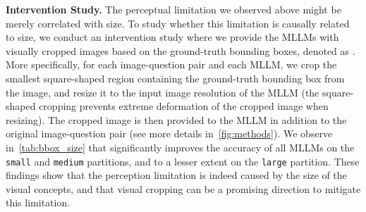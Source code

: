 \textbf{Intervention Study.} The perceptual limitation we observed above might be merely correlated with size. To study whether this limitation is causally related to size, we conduct an intervention study where we provide the MLLMs with visually cropped images based on the ground-truth bounding boxes, denoted as \hc{}. More specifically, for each image-question pair and each MLLM, we crop the smallest square-shaped region containing the ground-truth bounding box from the image, and resize it to the input image resolution of the MLLM (the square-shaped cropping prevents extreme deformation of the cropped image when resizing). The cropped image is then provided to the MLLM in addition to the original image-question pair (see more details in~\cref{fig:methods}). We observe in~\cref{tab:bbox_size} that \hc{} significantly improves the accuracy of all MLLMs on the \texttt{small} and \texttt{medium} partitions, and to a lesser extent on the \texttt{large} partition. These findings show that the perception limitation is indeed caused by the size of the visual concepts, and that visual cropping can be a promising direction to mitigate this limitation.